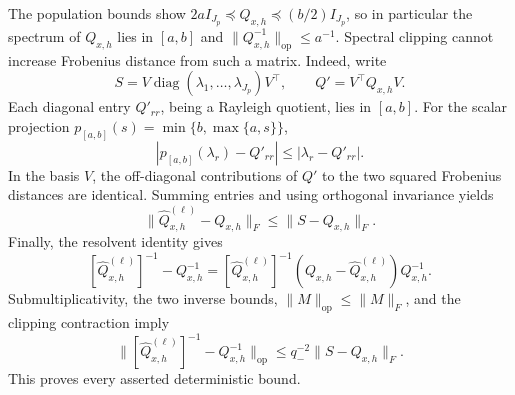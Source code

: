 The population bounds show \(2aI_{J_p}\preceq Q_{x,h}\preceq(b/2)I_{J_p}\), so in particular the spectrum of \(Q_{x,h}\) lies in \([a,b]\) and \(\lVert Q_{x,h}^{-1}\rVert_{\mathrm{op}}\le a^{-1}\). Spectral clipping cannot increase Frobenius distance from such a matrix. Indeed, write
\[
S=V\operatorname{diag}(\lambda_1,\ldots,\lambda_{J_p})V^\top,
\qquad Q'=V^\top Q_{x,h}V.
\]
Each diagonal entry \(Q'_{rr}\), being a Rayleigh quotient, lies in \([a,b]\). For the scalar projection \(p_{[a,b]}(s)=\min\{b,\max\{a,s\}\}\),
\[
|p_{[a,b]}(\lambda_r)-Q'_{rr}|\le|\lambda_r-Q'_{rr}|.
\]
In the basis \(V\), the off-diagonal contributions of \(Q'\) to the two squared Frobenius distances are identical. Summing entries and using orthogonal invariance yields
\[
\lVert\widehat Q^{(\ell)}_{x,h}-Q_{x,h}\rVert_F
\le\lVert S-Q_{x,h}\rVert_F.
\]
Finally, the resolvent identity gives
\[
[\widehat Q^{(\ell)}_{x,h}]^{-1}-Q_{x,h}^{-1}
=[\widehat Q^{(\ell)}_{x,h}]^{-1}
(Q_{x,h}-\widehat Q^{(\ell)}_{x,h})Q_{x,h}^{-1}.
\]
Submultiplicativity, the two inverse bounds, \(\lVert M\rVert_{\mathrm{op}}\le\lVert M\rVert_F\), and the clipping contraction imply
\[
\bigl\lVert[\widehat Q^{(\ell)}_{x,h}]^{-1}-Q_{x,h}^{-1}\bigr\rVert_{\mathrm{op}}
\le q_-^{-2}\lVert S-Q_{x,h}\rVert_F.
\]
This proves every asserted deterministic bound.